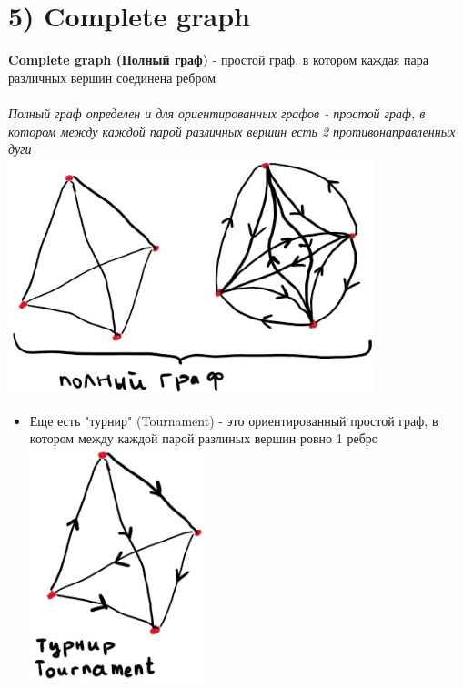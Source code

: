 \documentclass[../TM3-UltraDoc.tex]{subfiles}
\begin{document}
	\section*{5) Complete graph}
	\textbf{Complete graph (Полный граф)} - простой граф, в котором каждая пара различных вершин соединена ребром\\
	\\
	\textit{Полный граф определен и для ориентированных графов - простой граф, в котором между каждой парой различных вершин есть 2 противонаправленных дуги}\\
	\includegraphics[width = 0.8\textwidth]{5.1}
	\small
	\begin{tcolorbox}[colframe=gray!50!black, left=5pt, right=5pt, top=5pt, bottom=5pt, boxrule=1pt, colback=gray!10!white]
		\begin {itemize}
		\item Еще есть "турнир" (Tournament) - это ориентированный простой граф, в котором между каждой парой разлиных вершин ровно 1 ребро\\
		\includegraphics[width = 0.4\textwidth]{5.2}
	\end{itemize}
	\end{tcolorbox}
	\normalsize
\end{document}
